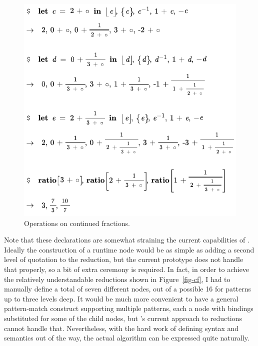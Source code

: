 \begin{figure}[th]
  \begin{center}
  
  \includegraphics[scale=0.8]{src/image/continued.pdf}
    
  \end{center}
  \caption{Operations on continued fractions.}
  \label{fig-cfex}
\end{figure}

Note that these declarations are somewhat straining the current capabilities of \Meta. Ideally the construction of a runtime node would be as simple as adding a second level of quotation to the  reduction, but the current prototype does not handle that properly, so a bit of extra ceremony is required. In fact, in order to achieve the relatively understandable reductions shown in Figure~\ref{fig-cf}, I had to manually define a total of seven different  nodes, out of a possible 16 for patterns up to three levels deep. It would be much more convenient to have a general pattern-match construct supporting multiple patterns, each a node with bindings substituted for some of the child nodes, but \Meta's current approach to reductions cannot handle that. Nevertheless, with the hard work of defining syntax and semantics out of the way, the actual algorithm can be expressed quite naturally.

